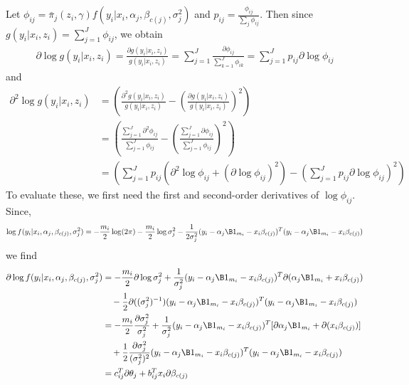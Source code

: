 Let $\phi_{ij} = \bar{\pi}_{j}(z_{i},\gamma)f(y_{i}|x_{i},\alpha_{j},\beta_{c(j)},\sigma^{2}_{j})$ and $p_{ij} = \frac{\phi_{ij}}{\sum_{j} \phi_{ij}}$. Then since $g(y_{i}|x_{i},z_{i})=\sum_{j=1}^{J}\phi_{ij}$, we obtain
\begin{align}\label{dg}
\partial \log g(y_{i}|x_{i},z_{i})=\frac{\partial g(y_{i}|x_{i},z_{i})}{g(y_{i}|x_{i},z_{i})}=\sum^{J}_{j=1}\frac{\partial \phi_{ij} }{\sum_{k=1}^{J} \phi_{ik}}=\sum^{J}_{j=1}p_{ij}\partial \log \phi_{ij}
\end{align}
and
\begin{align}\label{d2g}
\partial^{2} \log g(y_{i}|x_{i},z_{i})&=\left(\frac{\partial^{2} g(y_{i}|x_{i},z_{i})}{g(y_{i}|x_{i},z_{i})}-\left(\frac{\partial g(y_{i}|x_{i},z_{i})}{g(y_{i}|x_{i},z_{i})}\right)^{2}\right)\nonumber\\
&=\left(\frac{\sum^{J}_{j=1}\partial^{2}\phi_{ij}}{\sum^{J}_{j=1}\phi_{ij}}-\left(\frac{\sum^{J}_{j=1}\partial\phi_{ij}}{\sum^{J}_{j=1}\phi_{ij}}\right)^{2}\right)\nonumber\\
&=\left( \sum^{J}_{j=1}p_{ij}(\partial^{2}\log \phi_{ij} + (\partial \log \phi_{ij})^{2})-(\sum^{J}_{j=1}p_{ij}\partial \log \phi_{ij})^{2}\right)
\end{align}
To evaluate these, we first need the first and second-order derivatives of $\log\phi_{ij}$. Since,
$$\log f(y_{i}|x_{i},\alpha_{j},\beta_{c(j)},\sigma^{2}_{j})=-\frac{m_{i}}{2}\log(2\pi)-\frac{m_{i}}{2}\log\sigma_{j}^{2}-\frac{1}{2\sigma_{j}^{2}}(y_{i}-\alpha_{j}\B 1_{m_i}-x_{i}\beta_{c(j)})^{T}(y_{i}-\alpha_{j}\B 1_{m_i}-x_{i}\beta_{c(j)})$$
we find 
\begin{align*}
\partial \log f(y_{i}|x_{i},\alpha_{j},\beta_{c(j)},\sigma^{2}_{j}) &= -\frac{m_{i}}{2}\partial \log\sigma_{j}^{2}+\frac{1}{\sigma_{j}^{2}}(y_{i}-\alpha_{j}\B 1_{m_i}-x_{i}\beta_{c(j)})^{T}\partial (\alpha_{j}\B 1_{m_i}+x_{i}\beta_{c(j)})\\
&\quad- \frac{1}{2}\partial((\sigma_{j}^{2})^{-1})(y_{i}-\alpha_{j}\B 1_{m_i}-x_{i}\beta_{c(j)})^{T}(y_{i}-\alpha_{j}\B 1_{m_i}-x_{i}\beta_{c(j)})\\
&= -\frac{m_{i}}{2}\frac{\partial\sigma_{j}^{2}}{\sigma_{j}^{2}}+\frac{1}{\sigma_{j}^{2}}(y_{i}-\alpha_{j}\B 1_{m_i}-x_{i}\beta_{c(j)})^{T}[\partial \alpha_{j}\B 1_{m_i}+\partial(x_{i}\beta_{c(j)})]\\
&\quad+\frac{1}{2}\frac{\partial\sigma_{j}^{2}}{(\sigma_{j}^{2})^{2}}(y_{i}-\alpha_{j}\B 1_{m_i}-x_{i}\beta_{c(j)})^{T}(y_{i}-\alpha_{j}\B 1_{m_i}-x_{i}\beta_{c(j)})\\
&=c_{ij}^{T}\partial\theta_{j}+b_{ij}^{T}x_{i}\partial \beta_{c(j)}
\end{align*}
